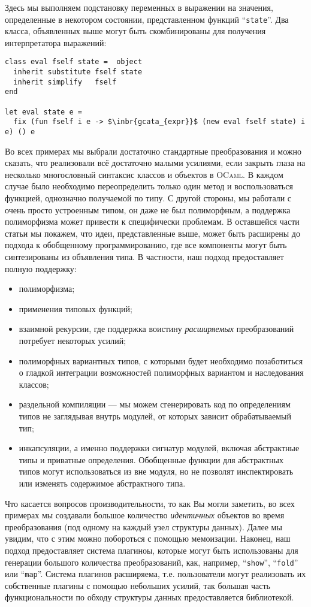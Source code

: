 Здесь мы выполняем подстановку переменных в выражении на значения, определенные в некотором состоянии, представленном функций ``\lstinline{state}''. Два класса, объявленных выше могут быть скомбинированы для получения интерпретатора выражений:

\begin{lstlisting}
class eval fself state =  object
  inherit substitute fself state
  inherit simplify   fself
end

let eval state e =
  fix (fun fself i e -> $\inbr{gcata_{expr}}$ (new eval fself state) i e) () e  
\end{lstlisting}

Во всех примерах мы выбрали достаточно стандартные преобразования и можно сказать, что реализовали всё достаточно малыми усилиями,
если закрыть глаза на несколько многословный синтаксис классов и объектов в  \textsc{OCaml}. В каждом случае было необходимо переопределить
только один метод и воспользоваться функцией, однозначно получаемой по типу. 
С другой стороны, мы работали с очень просто устроенным типом, он даже не был полиморфным, а поддержка полиморфизма может привести к 
специфически проблемам. В оставшейся части статьи мы покажем, что идеи, представленные выше, может быть расширены до подхода к обобщенному программированию, где все компоненты могут быть синтезированы из объявления типа. В частности, наш подход предоставляет полную поддержку:

\begin{itemize}
\item полиморфизма;
\item применения типовых функций;
\item взаимной рекурсии, где поддержка воистину \emph{расширяемых} преобразований потребует некоторых усилий;
\item полиморфных вариантных типов, с которыми будет необходимо позаботиться о гладкой интеграции возможностей полиморфных вариантом и наследования классов;
\item раздельной компиляции --- мы можем сгенерировать код по определениям типов не заглядывая внутрь модулей, от которых зависит обрабатываемый тип;
\item инкапсуляции, а именно поддержки сигнатур модулей, включая абстрактные типы и приватные определения. Обобщенные функции для абстрактных типов могут использоваться из вне модуля, но не позволят инспектировать или изменять содержимое абстрактного типа.
\end{itemize}

Что касается вопросов производительности, то как Вы могли заметить, во всех примерах мы создавали большое количество 
\emph{идентичных} объектов во время преобразования (под одному на каждый узел структуры данных). Далее мы увидим, что с этим можно побороться
с помощью мемоизации. Наконец, наш подход предоставляет система плагиноы, которые могут быть использованы для генерации большого количества преобразований, как, например, ``\lstinline{show}'', ``\lstinline{fold}'' или ``\lstinline{map}''. Система плагинов расширяема, т.е. пользователи могут  реализовать их собственные плагины с помощью небольших усилий, так большая часть функциональности по обходу структуры данных предоставляется библиотекой. 
